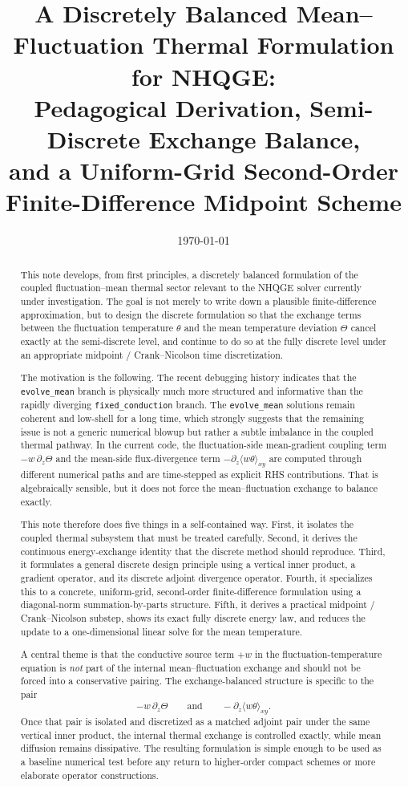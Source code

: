 \documentclass[11pt]{article}
\title{A Discretely Balanced Mean--Fluctuation Thermal Formulation for NHQGE:\\
Pedagogical Derivation, Semi-Discrete Exchange Balance,\\
and a Uniform-Grid Second-Order Finite-Difference Midpoint Scheme}
\author{}
\date{\today}
\begin{document}
\maketitle

\begin{abstract}
This note develops, from first principles, a discretely balanced formulation of the coupled fluctuation--mean thermal sector relevant to the NHQGE solver currently under investigation. The goal is not merely to write down a plausible finite-difference approximation, but to design the discrete formulation so that the exchange terms between the fluctuation temperature $\theta$ and the mean temperature deviation $\Theta$ cancel exactly at the semi-discrete level, and continue to do so at the fully discrete level under an appropriate midpoint / Crank--Nicolson time discretization.

The motivation is the following. The recent debugging history indicates that the \texttt{evolve\_mean} branch is physically much more structured and informative than the rapidly diverging \texttt{fixed\_conduction} branch. The \texttt{evolve\_mean} solutions remain coherent and low-shell for a long time, which strongly suggests that the remaining issue is not a generic numerical blowup but rather a subtle imbalance in the coupled thermal pathway. In the current code, the fluctuation-side mean-gradient coupling term $-w\,\partial_z\Theta$ and the mean-side flux-divergence term $-\partial_z\langle w\theta\rangle_{xy}$ are computed through different numerical paths and are time-stepped as explicit RHS contributions. That is algebraically sensible, but it does not force the mean--fluctuation exchange to balance exactly.

This note therefore does five things in a self-contained way. First, it isolates the coupled thermal subsystem that must be treated carefully. Second, it derives the continuous energy-exchange identity that the discrete method should reproduce. Third, it formulates a general discrete design principle using a vertical inner product, a gradient operator, and its discrete adjoint divergence operator. Fourth, it specializes this to a concrete, uniform-grid, second-order finite-difference formulation using a diagonal-norm summation-by-parts structure. Fifth, it derives a practical midpoint / Crank--Nicolson substep, shows its exact fully discrete energy law, and reduces the update to a one-dimensional linear solve for the mean temperature.

A central theme is that the conductive source term $+w$ in the fluctuation-temperature equation is \emph{not} part of the internal mean--fluctuation exchange and should not be forced into a conservative pairing. The exchange-balanced structure is specific to the pair
\[
-w\,\partial_z\Theta
\qquad\text{and}\qquad
-\partial_z\langle w\theta\rangle_{xy}.
\]
Once that pair is isolated and discretized as a matched adjoint pair under the same vertical inner product, the internal thermal exchange is controlled exactly, while mean diffusion remains dissipative. The resulting formulation is simple enough to be used as a baseline numerical test before any return to higher-order compact schemes or more elaborate operator constructions.
\end{abstract}
\end{document}
